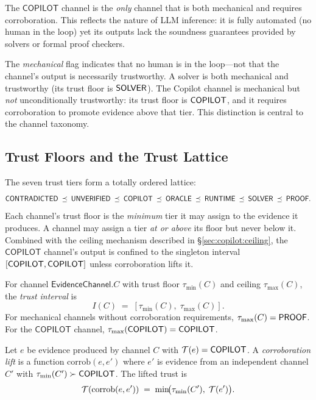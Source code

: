 \documentclass[11pt]{article}
\newcommand{\EvCh}{\mathsf{EvidenceChannel}}
\newcommand{\corrob}{\mathrm{corrob}}
\begin{document}
The $\mathsf{COPILOT}$ channel is the \emph{only} channel that is
both mechanical and requires corroboration.  This reflects the
nature of LLM inference: it is fully automated (no human in the
loop) yet its outputs lack the soundness guarantees provided by
solvers or formal proof checkers.

\begin{remark}
\label{rem:mechanical-trust}
The \emph{mechanical} flag indicates that no human is in the
loop---not that the channel's output is necessarily trustworthy.
A solver is both mechanical and trustworthy (its trust floor is
$\mathsf{SOLVER}$).  The Copilot channel is mechanical but
\emph{not} unconditionally trustworthy: its trust floor is
$\mathsf{COPILOT}$, and it requires corroboration to promote evidence
above that tier.  This distinction is central to the channel
taxonomy.
\end{remark}

\subsection{Trust Floors and the Trust Lattice}
\label{sec:arch:floors}

The seven trust tiers form a totally ordered lattice:
\[
  \mathsf{CONTRADICTED} \;\preceq\; \mathsf{UNVERIFIED} \;\preceq\; \mathsf{COPILOT} \;\preceq\;
  \mathsf{ORACLE} \;\preceq\; \mathsf{RUNTIME} \;\preceq\; \mathsf{SOLVER} \;\preceq\;
  \mathsf{PROOF}.
\]
Each channel's trust floor is the \emph{minimum} tier it may
assign to the evidence it produces.  A channel may assign a tier
\emph{at or above} its floor but never below it.  Combined with
the ceiling mechanism described in \S\ref{sec:copilot:ceiling},
the $\mathsf{COPILOT}$ channel's output is confined to the
singleton interval $[\mathsf{COPILOT}, \mathsf{COPILOT}]$ unless corroboration
lifts it.

\begin{definition}
\label{def:trust-interval}
For channel $\EvCh.C$ with trust floor $\tau_{\min}(C)$ and
ceiling $\tau_{\max}(C)$, the \emph{trust interval} is
\[
  I(C) \;=\; [\tau_{\min}(C),\; \tau_{\max}(C)].
\]
For mechanical channels without corroboration requirements,
$\tau_{\max}(C) = \mathsf{PROOF}$.  For the $\mathsf{COPILOT}$ channel,
$\tau_{\max}(\mathsf{COPILOT}) = \mathsf{COPILOT}$.
\end{definition}

\begin{definition}
\label{def:corrob-lift}
Let $e$ be evidence produced by channel $C$ with
$\mathcal{T}(e) = \mathsf{COPILOT}$.  A \emph{corroboration lift} is a
function $\corrob(e, e')$ where $e'$ is evidence from an
independent channel $C'$ with
$\tau_{\min}(C') \succ \mathsf{COPILOT}$.  The lifted trust is
\[
  \trust(\corrob(e, e')) \;=\;
    \min\!\bigl(\tau_{\min}(C'),\; \trust(e')\bigr).
\]
\end{definition}
\end{document}
